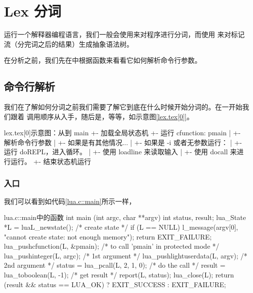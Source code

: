 

\chapter{Lex 分词}

运行一个解释器编程语言，我们一般会使用来对程序进行分词，而使用%
来对标记流（分完词之后的结果）生成抽象语法树。

在分析之前，我们先在中根据函数来看看它如何解析命令行参数。


\section{命令行解析}

我们在了解如何分词之前我们需要了解它到底在什么时候开始分词的。在一开始我们跟着
调用顺序从入手，随后是，等等，如示意图\ref{lex.tex[0]}。

\begin{code}{lex.tex[0]}{示意图：从到}
main
 +- 加载全局状态机
 +- 运行 cfunction: pmain
 |   +- 解析命令行参数
 |   +- 如果是有其他情况...
 |   +- 如果是 -i 或者无参数运行：
 |       +- 运行 doREPL，进入循环。
 |           +- 使用 loadline 来读取输入
 |           +- 使用 docall 来进行运行。
 +- 结束状态机运行
\end{code}


\subsection{入口}

我们可以看到如代码\ref{lua.c::main}所示一样，

\begin{ccode}{lua.c::main}{中的函数}
int main (int argc, char **argv) {
  int status, result;
  lua_State *L = luaL_newstate();  /* create state */
  if (L == NULL) {
    l_message(argv[0], "cannot create state: not enough memory");
    return EXIT_FAILURE;
  }
  lua_pushcfunction(L, &pmain);  /* to call 'pmain' in protected mode */
  lua_pushinteger(L, argc);  /* 1st argument */
  lua_pushlightuserdata(L, argv); /* 2nd argument */
  status = lua_pcall(L, 2, 1, 0);  /* do the call */
  result = lua_toboolean(L, -1);  /* get result */
  report(L, status);
  lua_close(L);
  return (result && status == LUA_OK) ? EXIT_SUCCESS : EXIT_FAILURE;
}
\end{ccode}

